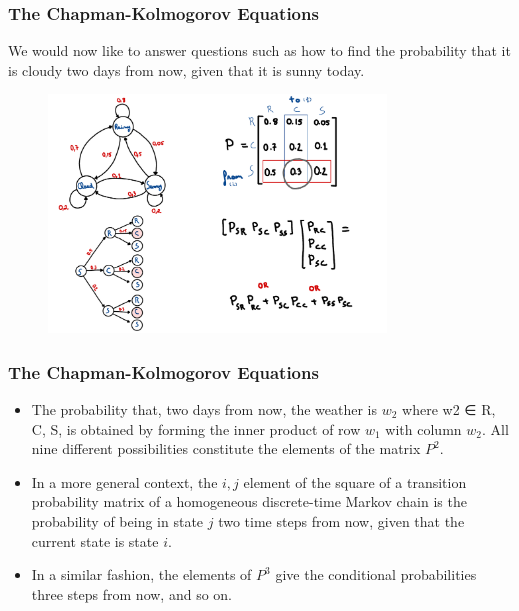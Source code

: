 \begin{frame}
    \frametitle{The Chapman-Kolmogorov Equations}
        We would now like to answer questions such as how to find the probability that it is cloudy two 
        days from now, given that it is sunny today.
        \begin{figure}
            \centering
            \includegraphics[width=0.8\textwidth]{slides/figures/markov_chain_2_steps_after_example_part_two.pdf}
        \end{figure}
\end{frame}


\begin{frame}
    \frametitle{The Chapman-Kolmogorov Equations}
    \begin{itemize}

        \item The probability that, two days from now, the weather is $w_2$ where w2 ∈ {R, C, S}, is obtained by
        forming the inner product of row $w_1$ with column $w_2$. All nine different possibilities constitute the
        elements of the matrix $P^2$.

        \item In a more general context, the $i,j$ element of the square of a transition probability matrix of 
        a homogeneous discrete-time Markov chain is the probability of being in state $j$ two time steps 
        from now, given that the current state is state $i$.

        \item In a similar fashion, the elements of $P^3$ give the conditional probabilities three steps from now, and so on. 
    \end{itemize}
\end{frame}



